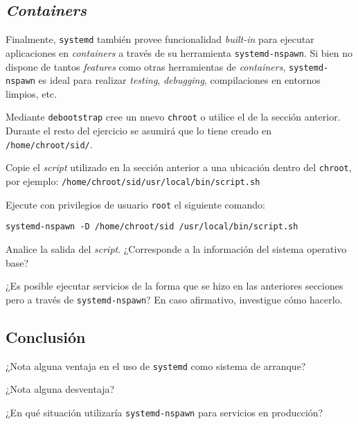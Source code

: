\subsection{\textit{Containers}}
Finalmente, \texttt{systemd} también provee funcionalidad \textit{built-in}
para ejecutar aplicaciones en \textit{containers} a través de su
herramienta \texttt{systemd-nspawn}. Si bien no dispone de tantos
\textit{features} como otras herramientas de \textit{containers},
\texttt{systemd-nspawn} es ideal para realizar \textit{testing},
\textit{debugging}, compilaciones en entornos limpios, etc.
\begin{questions}
  \question Mediante \texttt{debootstrap} cree un nuevo \texttt{chroot} o
  utilice el de la sección anterior. Durante el resto del ejercicio se
  asumirá que lo tiene creado en \texttt{/home/chroot/sid/}.

  \question Copie el \textit{script} utilizado en la sección anterior a una
  ubicación dentro del \texttt{chroot}, por ejemplo:
  \texttt{/home/chroot/sid/usr/local/bin/script.sh}

  \question Ejecute con privilegios de usuario \texttt{root} el siguiente
  comando:
\begin{verbatim}
systemd-nspawn -D /home/chroot/sid /usr/local/bin/script.sh
\end{verbatim}

  \question Analice la salida del \textit{script}. ¿Corresponde a la
  información del sistema operativo base?

  \question ¿Es posible ejecutar servicios de la forma que se hizo en las
  anteriores secciones pero a través de \texttt{systemd-nspawn}? En caso
  afirmativo, investigue cómo hacerlo.

\end{questions}

\subsection{Conclusión}
\begin{questions}
  \question ¿Nota alguna ventaja en el uso de \texttt{systemd} como sistema
  de arranque?

  \question ¿Nota alguna desventaja?

  \question ¿En qué situación utilizaría \texttt{systemd-nspawn} para
  servicios en producción?
\end{questions}